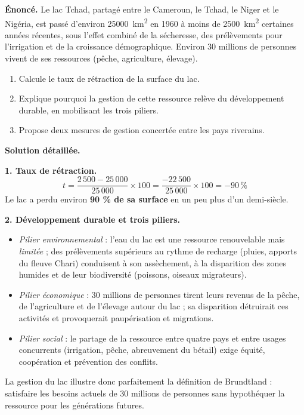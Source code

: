 \documentclass[11pt]{article}
\begin{document}
\begin{exoresolu}
\textbf{Énoncé.} Le lac Tchad, partagé entre le Cameroun, le Tchad, le Niger et le Nigéria, est passé d'environ \SI{25000}{km^2} en 1960 à moins de \SI{2500}{km^2} certaines années récentes, sous l'effet combiné de la sécheresse, des prélèvements pour l'irrigation et de la croissance démographique. Environ 30 millions de personnes vivent de ses ressources (pêche, agriculture, élevage).
\begin{enumerate}
\item Calcule le taux de rétraction de la surface du lac.
\item Explique pourquoi la gestion de cette ressource relève du développement durable, en mobilisant les trois piliers.
\item Propose deux mesures de gestion concertée entre les pays riverains.
\end{enumerate}
\tcblower
\textbf{Solution détaillée.}

\textbf{1. Taux de rétraction.}
\[ t = \frac{2\,500 - 25\,000}{25\,000} \times 100 = \frac{-22\,500}{25\,000} \times 100 = -90\,\% \]
Le lac a perdu environ \textbf{90 \% de sa surface} en un peu plus d'un demi-siècle.

\textbf{2. Développement durable et trois piliers.}
\begin{itemize}
\item \emph{Pilier environnemental} : l'eau du lac est une ressource renouvelable mais \emph{limitée} ; des prélèvements supérieurs au rythme de recharge (pluies, apports du fleuve Chari) conduisent à son assèchement, à la disparition des zones humides et de leur biodiversité (poissons, oiseaux migrateurs).
\item \emph{Pilier économique} : 30 millions de personnes tirent leurs revenus de la pêche, de l'agriculture et de l'élevage autour du lac ; sa disparition détruirait ces activités et provoquerait paupérisation et migrations.
\item \emph{Pilier social} : le partage de la ressource entre quatre pays et entre usages concurrents (irrigation, pêche, abreuvement du bétail) exige équité, coopération et prévention des conflits.
\end{itemize}
La gestion du lac illustre donc parfaitement la définition de Brundtland : satisfaire les besoins actuels de 30 millions de personnes sans hypothéquer la ressource pour les générations futures.


\end{exoresolu}
\end{document}
